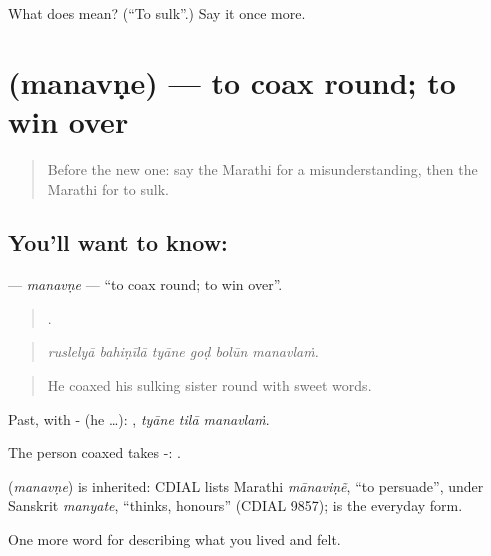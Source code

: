 \begin{tcolorbox}[breakable,colback=teal!4,colframe=teal!35!black,title={Before you move on}]
What does  mean? (\textquotedblleft{}To sulk\textquotedblright{}.) Say it once more.
\end{tcolorbox}
\section[\texorpdfstring{\mr{मनवणे} (manavṇe)}{मनवणे (manavṇe)}]{ (manavṇe) — to coax round; to win over}

\label{lesson:MR-C454-manavne}



\begin{quote}
Before the new one: say the Marathi for a misunderstanding, then the Marathi for to sulk.
\end{quote}

\subsection*{You'll want to know: }
\textbf{} — \emph{manavṇe} — \textquotedblleft{}to coax round; to win over\textquotedblright{}.

\begin{quote}
     .
\end{quote}

\begin{quote}
\emph{ruslelyā bahiṇīlā tyāne goḍ bolūn manavlaṁ.}
\end{quote}

\begin{quote}
He coaxed his sulking sister round with sweet words.
\end{quote}

Past, with - (he …):   , \emph{tyāne tilā manavlaṁ}.

The person coaxed takes -:   .

\begin{cousinweb}
\textbf{} (\emph{manavṇe}) is inherited: CDIAL lists Marathi \emph{mānaviṇẽ}, \textquotedblleft{}to persuade\textquotedblright{}, under Sanskrit \emph{manyate}, \textquotedblleft{}thinks, honours\textquotedblright{} (CDIAL 9857);  is the everyday form.
\end{cousinweb}

\begin{grammarlens}[title={What you've built}]
One more word for describing what you lived and felt.
\end{grammarlens}

